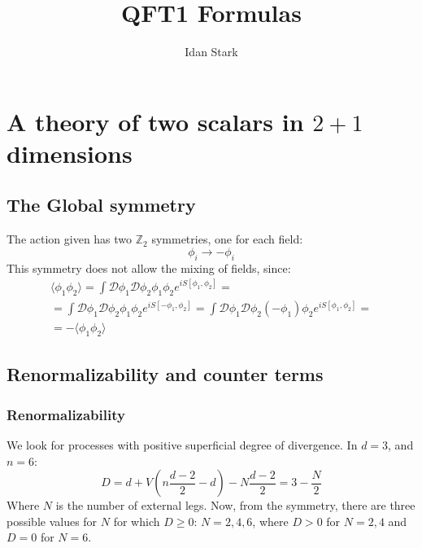 \documentclass{article}
\title{QFT1 Formulas}
\author{Idan Stark}
\begin{document}
\maketitle

\section{A theory of two scalars in $2+1$ dimensions}
\subsection{The Global symmetry}
The action given has two $\mathbb{Z}_2$ symmetries, one for each field:
\begin{equation}
    \phi_i \rightarrow -\phi_i
\end{equation}
This symmetry does not allow the mixing of fields, since:
\begin{equation}
\begin{gathered}
    \langle \phi_1 \phi_2 \rangle =
    \int \mathcal{D}\phi_1\mathcal{D}\phi_2 \phi_1 \phi_2 e^{iS[\phi_1, \phi_2]} = \\ =
    \int \mathcal{D}\phi_1\mathcal{D}\phi_2 \phi_1 \phi_2 e^{iS[-\phi_1, \phi_2]} =
    \int \mathcal{D}\phi_1\mathcal{D}\phi_2 (-\phi_1) \phi_2 e^{iS[\phi_1, \phi_2]} = \\ =
    -\langle \phi_1 \phi_2 \rangle
\end{gathered}
\end{equation}
\subsection{Renormalizability and counter terms}
\subsubsection*{Renormalizability}
We look for processes with positive superficial degree of divergence. In $d = 3$, and $n = 6$:
\begin{equation}
    D = d + V\left(n \frac{d-2}{2} - d\right) - N \frac{d-2}{2} = 3 - \frac{N}{2}
\end{equation}
Where $N$ is the number of external legs. Now, from the symmetry, there are three possible values for $N$ for which $D \ge 0$: $N = 2, 4, 6$, where $D > 0$ for $N = 2,4$ and $D = 0$ for $N = 6$.
\end{document}
